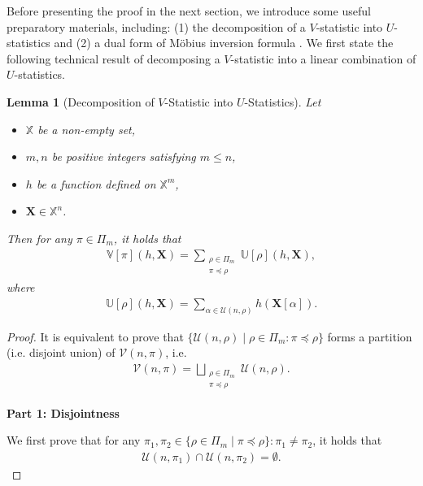 \documentclass[sn-mathphys, natbib=false]{sn-jnl}
\theoremstyle{plain}
\newtheorem{lemma}{Lemma}
\theoremstyle{definition}
\newcommand{\mobius}{M\"obius}
\newcommand{\sPi}{\pi}
\newcommand{\uset}{\calU}
\newcommand{\usetnm}[2]{\uset\left(#1,#2\right)}
\newcommand{\vset}{\calV}
\newcommand{\vsetp}[2]{\vset(#1,#2)}
\newcommand{\ustat}{\mathbb{U}}
\newcommand{\vstat}{\mathbb{V}}
\newcommand{\samplespace}{\bbX}
\newcommand{\partition}{\Pi}
\newcommand{\partitionp}[1]{\partition_{#1}}
\newcommand{\pleq}{\preceq}
\def\bbX{\mathbb{X}}
\def\calV{\mathcal{V}}
\def\calU{\mathcal{U}}
\begin{document}
\begin{bibunit}[agsm]
Before presenting the proof in the next section, we introduce some useful preparatory materials, including: (1) the decomposition of a $V$-statistic into $U$-statistics and (2) a dual form of \mobius{} inversion formula \citep{stanley2011enumerative}. We first state the following technical result of decomposing a $V$-statistic into a linear combination of $U$-statistics. 
\begin{lemma}[Decomposition of $V$-Statistic into $U$-Statistics]
\label{lem:decomp_v_to_u}
    Let
    \begin{itemize}
        \item $\samplespace$ be a non-empty set, 
        \item $m,n$ be positive integers satisfying $m \leq n$, 
        \item $h$ be a function defined on $\bbX^m$, 
        \item $\bm{X} \in \samplespace^n$. 
    \end{itemize}
    Then for any $\sPi \in \partitionp{m}$, it holds that
    \begin{align*}
        \vstat[\sPi](h, \bm{X}) = \sum_{\substack{
            \rho \in \partitionp{m} \\ \sPi \pleq \rho
        }} \ustat[\rho](h,\bm{X}),
    \end{align*}
    where
     \begin{align*}
       \ustat[\rho](h,\bm{X}) = \sum_{\alpha \in \usetnm{n}{\rho}} h(\bm{X}[\alpha]). 
    \end{align*}
\end{lemma}

\begin{proof}
It is equivalent to prove that $\{\usetnm{n}{\rho} \mid \rho \in \partitionp{m}: \sPi \pleq \rho\}$ forms a partition (i.e. disjoint union) of $\vsetp{n}{\sPi}$, i.e.
\begin{align*}
\vsetp{n}{\sPi} = \bigsqcup_{\substack{\rho \in \partitionp{m} \\ \sPi \pleq \rho} }\usetnm{n}{\rho}.
\end{align*}

    {\bf Part 1: Disjointness}
    
    We first prove that for any $\pi_1, \pi_2 \in \{\rho \in \partitionp{m} \mid \sPi \pleq \rho \}: \pi_1 \neq \pi_2$, it holds that
    \begin{align*}
        \usetnm{n}{\pi_1} \cap \usetnm{n}{\pi_2} = \emptyset. 
    \end{align*}


\end{proof}
\end{bibunit}
\end{document}
